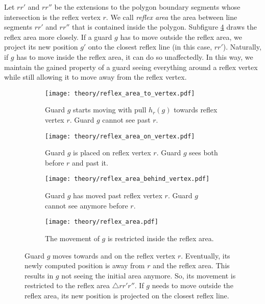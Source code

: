 Let $rr'$ and $rr''$ be the extensions to the polygon boundary segments whose intersection is the reflex vertex $r$. We call \textit{reflex area} the area between line segments $rr'$ and $rr''$ that is contained inside the polygon. Subfigure \ref{fig:reflex_area} draws the reflex area more closely. If a guard $g$ has to move outside the reflex area, we project its new position $g'$ onto the closest reflex line (in this case, $rr'$). Naturally, if $g$ has to move inside the reflex area, it can do so unaffectedly. In this way, we maintain the gained property of a guard seeing everything around a reflex vertex while still allowing it to move away from the reflex vertex.

\newpage
\begin{figure}[h!]
    \centering
    \begin{subfigure}{0.45\textwidth}
        \texttt{[image: theory/reflex\_area\_to\_vertex.pdf]}
        \caption{Guard $g$ starts moving with pull $h_r(g)$ towards reflex vertex $r$. Guard $g$ cannot see past $r$.}
        \label{fig:pull_to_on_behind1}
    \end{subfigure}
    \hfill
    \begin{subfigure}{0.45\textwidth}
        \texttt{[image: theory/reflex\_area\_on\_vertex.pdf]}
        \caption{Guard $g$ is placed on reflex vertex $r$. Guard $g$ sees both before $r$ and past it.}
        \label{fig:pull_to_on_behind2}
    \end{subfigure}
    \begin{subfigure}{0.45\textwidth}
        \texttt{[image: theory/reflex\_area\_behind\_vertex.pdf]}
        \caption{Guard $g$ has moved past reflex vertex $r$. Guard $g$ cannot see anymore before $r$.}
        \label{fig:pull_to_on_behind3}
    \end{subfigure}
    \hfill
    \begin{subfigure}{0.45\textwidth}
        \texttt{[image: theory/reflex\_area.pdf]}
        \caption{The movement of $g$ is restricted inside the reflex area.}
        \label{fig:reflex_area}
    \end{subfigure}
    \caption{Guard $g$ moves towards and on the reflex vertex $r$. Eventually, its newly computed position is away from $r$ and the reflex area. This results in $g$ not seeing the initial area anymore. So, its movement is restricted to the reflex area $\triangle rr'r''$. If $g$ needs to move outside the reflex area, its new position is projected on the closest reflex line.}
    \label{fig:pull_to_on_behind}
\end{figure}

